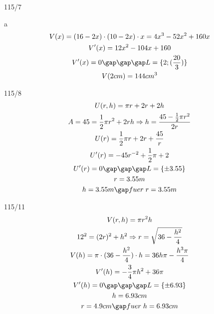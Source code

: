 \begin{exercise}{115/7}
  \item [a]
  \begin{gather*}
    V(x) = (16 - 2x) \cdot (10 - 2x) \cdot x = 4x^3 - 52x^2 + 160x \\
    V'(x) = 12x^2 - 104x + 160 \\
    V'(x) = 0 \gap\gap\gap L = \{2; (\frac{20}{3})\} \\
    V(2cm) = 144cm^3
  \end{gather*}
\end{exercise}
\begin{exercise}{115/8}
  \begin{gather*}
    U(r, h) = \pi r + 2r + 2h \\
    A = 45 = \frac{1}{2}\pi r^2 + 2rh \Rightarrow h = \frac{45 - \frac{1}{2}\pi r^2}{2r} \\
    U(r) = \frac{1}{2}\pi r + 2r + \frac{45}{r} \\
    U'(r) = -45r^{-2} + \frac{1}{2}\pi + 2 \\
    U'(r) = 0 \gap\gap\gap L = \{\pm 3.55\} \\
    r = 3.55m \\
    h = 3.55m \gap fuer \; r = 3.55m
  \end{gather*}
\end{exercise}
\begin{exercise}{115/11}
  \begin{gather*}
    V(r, h) = \pi r^2h \\
    12^2 = (2r)^2 + h^2 \Rightarrow r = \sqrt{36 - \frac{h^2}{4}} \\
    V(h) = \pi \cdot (36 - \frac{h^2}{4}) \cdot h = 36h\pi - \frac{h^3\pi}{4} \\
    V'(h) = -\frac{3}{4}\pi h^2 + 36\pi \\
    V'(h) = 0 \gap\gap\gap L = \{\pm 6.93\} \\
    h = 6.93cm \\
    r = 4.9 cm \gap fuer \; h = 6.93cm
  \end{gather*}
\end{exercise}
